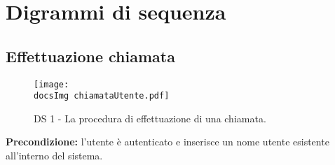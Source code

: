 \section{Digrammi di sequenza}

\begin{sloppypar}

\subsection{Effettuazione chiamata}
\begin{center}
				\begin{figure}[h!tbp]
					\centering
					\texttt{[image: \\docsImg chiamataUtente.pdf]}
				\caption{DS 1 - La procedura di effettuazione di una chiamata.}	
				\end{figure}
			\end{center}
\noindent \textbf{Precondizione: }l'utente è autenticato e inserisce un nome utente esistente all'interno del sistema.\\


\end{sloppypar}
